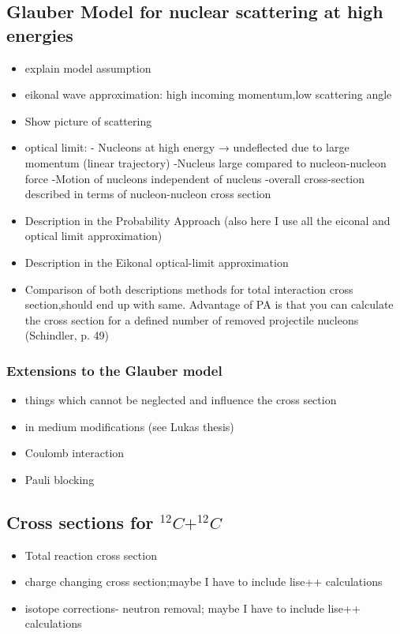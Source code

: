 \subsection{Glauber Model for nuclear scattering at high energies}
\begin{itemize}
\item explain model assumption
\item eikonal wave approximation: high incoming momentum,low scattering angle
\item Show picture of scattering
\item optical limit: - Nucleons at high energy → undeflected due to large momentum (linear trajectory)
		   -Nucleus large compared to nucleon-nucleon  force
		   -Motion of nucleons independent of nucleus
		   -overall cross-section described in terms of nucleon-nucleon cross section
\item Description in the Probability Approach (also here I use all the eiconal and optical limit approximation)
\item Description in the Eikonal optical-limit approximation
\item Comparison of both descriptions methods  for total interaction cross section,should end up with same. Advantage of PA is that you can calculate the cross section for a defined number of removed projectile nucleons (Schindler, p. 49)
\end{itemize}
\subsubsection{Extensions to the Glauber model}
\begin{itemize}
\item things which cannot be neglected and influence the cross section
\item in medium modifications (see Lukas thesis)
\item Coulomb interaction
\item Pauli blocking
\end{itemize}
\subsection{Cross sections for $^{12}C + ^{12}C$}
\begin{itemize}
\item Total reaction cross section
\item charge changing cross section;maybe I have to include lise++ calculations
\item isotope corrections- neutron removal; maybe I have to include lise++ calculations
\end{itemize}

